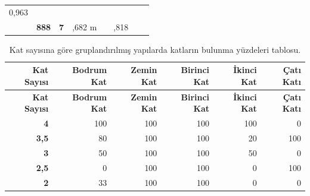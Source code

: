 \documentclass[12pt,turkish,a4paperpaper,]{report}
\begin{document}
\begin{longtable}[]{@{}lrrrrrrr@{}}
\begin{minipage}[t]{0.14\columnwidth}
0,963\strut
\end{minipage} & \begin{minipage}[t]{0.14\columnwidth}\raggedleft
\strut
\end{minipage} & \begin{minipage}[t]{0.12\columnwidth}\raggedleft
\strut
\end{minipage}\tabularnewline
\begin{minipage}[t]{0.02\columnwidth}\raggedright
\strut
\end{minipage} & \begin{minipage}[t]{0.04\columnwidth}\raggedleft
\textbf{888}\strut
\end{minipage} & \begin{minipage}[t]{0.04\columnwidth}\raggedleft
\textbf{7}\strut
\end{minipage} & \begin{minipage}[t]{0.14\columnwidth}\raggedleft
4,682 m\strut
\end{minipage} & \begin{minipage}[t]{0.14\columnwidth}\raggedleft
\strut
\end{minipage} & \begin{minipage}[t]{0.14\columnwidth}\raggedleft
0,818\strut
\end{minipage} & \begin{minipage}[t]{0.14\columnwidth}\raggedleft
\strut
\end{minipage} & \begin{minipage}[t]{0.12\columnwidth}\raggedleft
\strut
\end{minipage}\tabularnewline
\bottomrule
\end{longtable}

\begin{longtable}[]{@{}rrrrrr@{}}
\caption{Kat sayısına göre gruplandırılmış yapılarda katların bulunma
yüzdeleri tablosu. \label{katbulunmayuzde}}\tabularnewline
\toprule
\textbf{Kat Sayısı} & \textbf{Bodrum Kat} & \textbf{Zemin Kat} &
\textbf{Birinci Kat} & \textbf{İkinci Kat} & \textbf{Çatı
Katı}\tabularnewline
\midrule
\endfirsthead
\toprule
\textbf{Kat Sayısı} & \textbf{Bodrum Kat} & \textbf{Zemin Kat} &
\textbf{Birinci Kat} & \textbf{İkinci Kat} & \textbf{Çatı
Katı}\tabularnewline
\midrule
\endhead
\textbf{4} & 100 & 100 & 100 & 100 & 0\tabularnewline
\textbf{3,5} & 80 & 100 & 100 & 20 & 100\tabularnewline
\textbf{3} & 50 & 100 & 100 & 50 & 0\tabularnewline
\textbf{2,5} & 0 & 100 & 100 & 0 & 100\tabularnewline
\textbf{2} & 33 & 100 & 100 & 0 & 0\tabularnewline
\bottomrule
\end{longtable}
\end{document}
